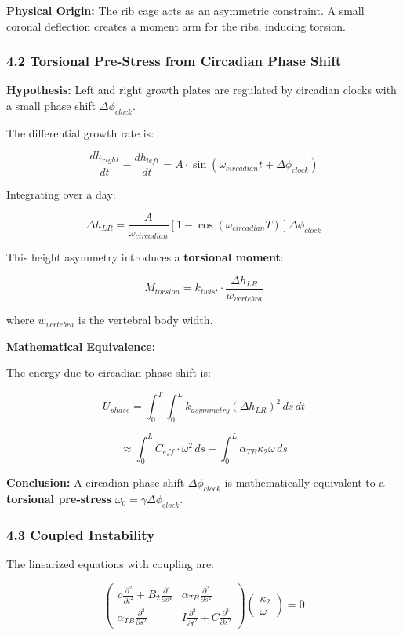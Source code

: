 \documentclass[11pt,a4paper]{article}
\begin{document}
\textbf{Physical Origin:} The rib cage acts as an asymmetric constraint. A small coronal deflection creates a moment arm for the ribs, inducing torsion.

\subsubsection{4.2 Torsional Pre-Stress from Circadian Phase Shift}

\textbf{Hypothesis:} Left and right growth plates are regulated by circadian clocks with a small phase shift $\Delta \phi_{clock}$.

The differential growth rate is:

$$
\frac{dh_{right}}{dt} - \frac{dh_{left}}{dt} = A \cdot \sin(\omega_{circadian} t + \Delta \phi_{clock})
$$

Integrating over a day:

$$
\Delta h_{LR} = \frac{A}{\omega_{circadian}} \left[1 - \cos(\omega_{circadian} T) \right] \Delta \phi_{clock}
$$

This height asymmetry introduces a \textbf{torsional moment}:

$$
M_{torsion} = k_{twist} \cdot \frac{\Delta h_{LR}}{w_{vertebra}}
$$

where $w_{vertebra}$ is the vertebral body width.

\textbf{Mathematical Equivalence:}

The energy due to circadian phase shift is:

$$
U_{phase} = \int_0^T \int_0^L k_{asymmetry} (\Delta h_{LR})^2 \, ds \, dt
$$

$$
\approx \int_0^L C_{eff} \cdot \omega^2 \, ds + \int_0^L \alpha_{TB} \kappa_2 \omega \, ds
$$

\textbf{Conclusion:} A circadian phase shift $\Delta \phi_{clock}$ is mathematically equivalent to a \textbf{torsional pre-stress} $\omega_0 = \gamma \Delta \phi_{clock}$.

\subsubsection{4.3 Coupled Instability}

The linearized equations with coupling are:

$$
\begin{pmatrix}
\rho \frac{\partial^2}{\partial t^2} + B_2 \frac{\partial^4}{\partial s^4} & \alpha_{TB} \frac{\partial^2}{\partial s^2} \\
\alpha_{TB} \frac{\partial^2}{\partial s^2} & I \frac{\partial^2}{\partial t^2} + C \frac{\partial^2}{\partial s^2}
\end{pmatrix}
\begin{pmatrix}
\kappa_2 \\
\omega
\end{pmatrix}
= 0
$$
\end{document}
